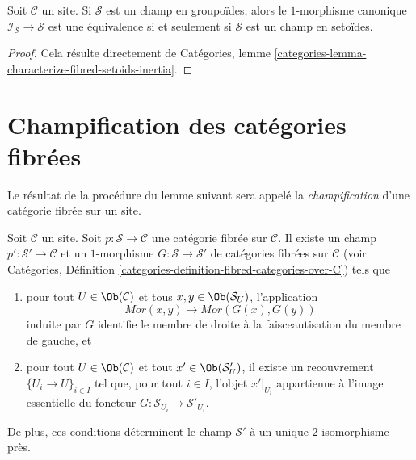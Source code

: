 \begin{lemma}
\label{lemma-characterize-stack-in-setoids}
Soit $\mathcal{C}$ un site.
Si $\mathcal{S}$ est un champ en groupoïdes, alors le
$1$-morphisme canonique $\mathcal{I}_\mathcal{S} \to \mathcal{S}$
est une équivalence si et seulement si $\mathcal{S}$ est un champ en setoïdes.
\end{lemma}

\begin{proof}
Cela résulte directement de
Catégories, lemme \ref{categories-lemma-characterize-fibred-setoids-inertia}.
\end{proof}

\section{Champification des catégories fibrées}
\label{section-stackify}

\noindent
Le résultat de la procédure du lemme suivant sera appelé la
{\it champification} d'une catégorie fibrée sur un site.

\begin{lemma}
\label{lemma-stackify}
Soit $\mathcal{C}$ un site.
Soit $p : \mathcal{S} \to \mathcal{C}$ une catégorie fibrée sur $\mathcal{C}$.
Il existe un champ $p' : \mathcal{S}' \to \mathcal{C}$ et un
$1$-morphisme $G : \mathcal{S} \to \mathcal{S}'$
de catégories fibrées sur $\mathcal{C}$ (voir
Catégories, Définition \ref{categories-definition-fibred-categories-over-C})
tels que
\begin{enumerate}
\item pour tout $U \in \Ob(\mathcal{C})$ et tous
$x, y \in \Ob(\mathcal{S}_U)$, l'application
$$
\mathit{Mor}(x, y) \longrightarrow \mathit{Mor}(G(x), G(y))
$$
induite par $G$ identifie le membre de droite à la faisceautisation
du membre de gauche, et
\item pour tout $U \in \Ob(\mathcal{C})$ et tout
$x' \in \Ob(\mathcal{S}'_U)$, il existe un recouvrement
$\{U_i \to U\}_{i \in I}$ tel que, pour tout $i \in I$,
l'objet $x'|_{U_i}$ appartienne à l'image essentielle du
foncteur $G : \mathcal{S}_{U_i} \to \mathcal{S}'_{U_i}$.
\end{enumerate}
De plus, ces conditions déterminent le champ $\mathcal{S}'$ à un unique
$2$-isomorphisme près.
\end{lemma}

